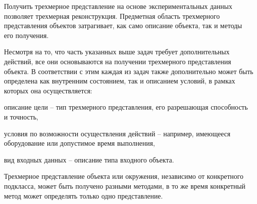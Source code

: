 Получить трехмерное представление на основе экспериментальных данных позволяет трехмерная реконструкция. Предметная область трехмерного представления объектов затрагивает, как само описание объекта, так и методы его получения.

\begin{SCn}
\end{SCn}

Несмотря на то, что часть указанных выше задач требует дополнительных действий, все они основываются на получении трехмерного представления объекта. В соответствии с этим каждая из задач также дополнительно может быть определена как внутренним состоянием, так и описанием условий, в рамках которых она осуществляется:
\begin{textitemize}
    \item описание цели -- тип трехмерного представления, его разрешающая способность и точность,
    \item условия по возможности осуществления действий -- например, имеющееся оборудование или допустимое время выполнения,
    \item вид входных данных -- описание типа входного объекта.
\end{textitemize}

Трехмерное представление объекта или окружения, независимо от конкретного подкласса, может быть получено разными методами, в то же время конкретный метод может определять только одно представление.

